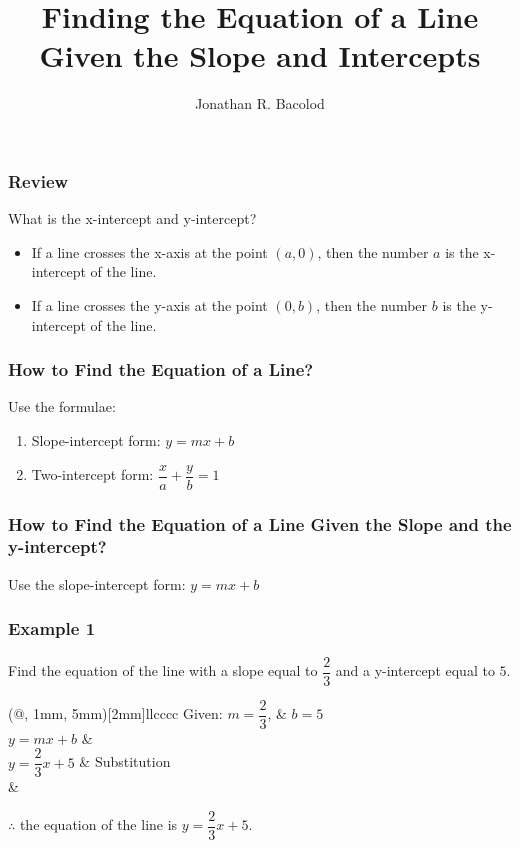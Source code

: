 \documentclass[14pt]{beamer}
\title[] {Finding the Equation of a Line Given the Slope and Intercepts}
\author{Jonathan R. Bacolod}
\institute[SHS]{Sauyo High School}
\date{}
\begin{document}
	\frame{\titlepage}
	
	\begin{frame}
		\frametitle{Review}
		What is the x-intercept and y-intercept?
		\begin{itemize}
			\item If a line crosses the x-axis at the point $ (a,0) $, then the
			number $ a $ is the x-intercept of the line.
			\item \pause If a line crosses the y-axis at the point $ (0,b) $, then the
			number $ b $ is the y-intercept of the line. 
		\end{itemize}
	\end{frame}
		
	\begin{frame}
		\frametitle{How to Find the Equation of a Line?}
		Use the formulae:
		\begin{enumerate}  
			\item Slope-intercept form: $ y = mx + b $
			\item \pause Two-intercept form: $  \dfrac{x}{a} + \dfrac{y}{b} = 1$
		\end{enumerate}  
	\end{frame}

    \begin{frame}
    	\frametitle{How to Find the Equation of a Line Given the Slope and the y-intercept?}
    	Use the slope-intercept form: $ y = mx + b $
    \end{frame}

    \begin{frame}
    	\frametitle{Example 1}
    	Find the equation of the line with a slope equal to $ \dfrac{2}{3} $ and a y-intercept equal to $ 5 $.
    	    	
    	\begin{TAB}(@, 1mm, 5mm)[2mm]{ll}{cccc}
    		\pause Given: $ m = \dfrac{2}{3} $,  & \pause $ b = 5 $  \\
    		
    		\pause $ y = mx + b  $  &  \\
    		
    		\pause $ y = \dfrac{2}{3}x + 5  $ & \pause Substitution \\
    		& \\
    	\end{TAB}
  
      $ \therefore $ the equation of the line is $ y = \dfrac{2}{3}x + 5 $.
    \end{frame}
\end{document}
